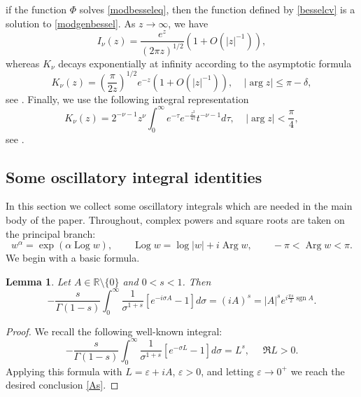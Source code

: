 \documentclass[11pt,letter]{amsart}
\def \R {\mathbb{R}}
\def \G{\Gamma}
\numberwithin{equation}{section}
\newcommand{\ve}{\varepsilon}
\newtheorem{lemma}[theorem]{Lemma}
\numberwithin{equation}{section}
\begin{document}
if the function $\Phi$ solves \eqref{modbesseleq}, then the function defined by \eqref{besselcv}
is a solution to \eqref{modgenbessel}.
As $z\to \infty$, we have 
\begin{equation}\label{ab}
I_\nu(z) =  \frac{e^z}{(2\pi z)^{1/2}} \left(1+ O(|z|^{-1})\right),
\end{equation}
whereas $K_\nu$ decays exponentially at infinity according to the asymptotic formula
\begin{equation}\label{abK}
K_\nu(z) = \left(\frac{\pi}{2z}\right)^{1/2} e^{-z}  \left(1+ O(|z|^{-1})\right), \ \ \ \ \ |\arg z| \le \pi - \delta,
\end{equation}
see \cite[(5.11.9) on p.123]{Le}. Finally, we use the following integral representation 
\begin{equation}\label{intK}
K_\nu(z) = 2^{-\nu-1} z^\nu \int_0^\infty e^{-\tau} e^{-\frac{z^2}{4\tau}} t^{-\nu-1} d\tau,\ \ \ \ \ |\arg z|<\frac{\pi}4,
\end{equation}  
see \cite[(5.10.25), p.119]{Le}.

\subsection{Some oscillatory integral identities}\label{S:osc2}

In this section we collect some  oscillatory integrals which are needed in the main body of the paper. Throughout, complex powers and square roots are taken on the principal
branch:
\[
w^\alpha=\exp(\alpha \operatorname{Log} w),
\qquad
\operatorname{Log} w=\log|w|+i\operatorname{Arg} w,
\qquad
-\pi<\operatorname{Arg} w<\pi.
\]
We begin with a basic formula.
 
 \begin{lemma}\label{L:aux}
 Let $A\in \R\setminus\{0\}$ and $0<s<1$. Then
 \begin{equation}\label{As}
 -\frac{s}{\G(1-s)} \int_0^\infty \frac{1}{\sigma^{1+s}} [e^{-i \sigma A} - 1] d\sigma = (i A)^s = |A|^s e^{i\frac{\pi s}{2} \operatorname{sgn}A}.
 \end{equation}
 \end{lemma}
 
 \begin{proof}
We recall the following well-known integral:
\[
-\frac{s}{\G(1-s)} \int_0^\infty \frac{1}{\sigma^{1+s}} [e^{-\sigma L } - 1] d\sigma = L^s,\ \ \ \ \ \ \Re L>0.
\]
Applying this formula with $L = \ve+iA$, $\ve>0$, and letting $\ve\to 0^+$ we reach the desired conclusion \eqref{As}.

 \end{proof}
 
\end{document}
